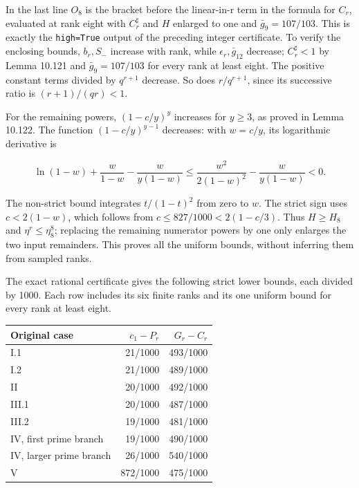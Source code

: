 \documentclass[
  11pt,
  a4paper,
]{article}
\newcounter{none} %
\begin{document}
In the last line \(O_8\) is the bracket before the linear-in-r term in
the formula for \(C_r\), evaluated at rank eight with \(C_r^\sharp\) and
\(H\) enlarged to one and \(\bar g_9=107/103\). This is exactly the
\texttt{high=True} output of the preceding integer certificate. To
verify the enclosing bounds, \(b_r,S_-\) increase with rank, while
\(\epsilon_r,\bar g_{12}\) decrease; \(C_r^\sharp<1\) by Lemma 10.121
and \(\bar g_9=107/103\) for every rank at least eight. The positive
constant terms divided by \(q^{r+1}\) decrease. So does \(r/q^{r+1}\),
since its successive ratio is \((r+1)/(qr)<1\).

For the remaining powers, \((1-c/y)^y\) increases for \(y\ge3\), as
proved in Lemma 10.122. The function \((1-c/y)^{y-1}\) decreases: with
\(w=c/y\), its logarithmic derivative is

\[
\ln(1-w)+\frac{w}{1-w}-\frac{w}{y(1-w)}
\le\frac{w^2}{2(1-w)^2}-\frac{w}{y(1-w)}<0.
\tag{10.411}
\]

The non-strict bound integrates \(t/(1-t)^2\) from zero to \(w\). The
strict sign uses \(c<2(1-w)\), which follows from
\(c\le827/1000<2(1-c/3)\). Thus \(H\ge H_8\) and \(\eta^r\le\eta_8^8\);
replacing the remaining numerator powers by one only enlarges the two
input remainders. This proves all the uniform bounds, without inferring
them from sampled ranks.

The exact rational certificate gives the following strict lower bounds,
each divided by 1000. Each row includes its six finite ranks and its one
uniform bound for every rank at least eight.

{\def\LTcaptype{none} %
\begin{longtable}[]{@{}lrr@{}}
\toprule\noalign{}
Original case & \(c_1-P_r\) & \(G_r-C_r\) \\
\midrule\noalign{}
\endhead
\bottomrule\noalign{}
\endlastfoot
I.1 & 21/1000 & 493/1000 \\
I.2 & 21/1000 & 489/1000 \\
II & 20/1000 & 492/1000 \\
III.1 & 20/1000 & 487/1000 \\
III.2 & 19/1000 & 481/1000 \\
IV, first prime branch & 19/1000 & 490/1000 \\
IV, larger prime branch & 26/1000 & 540/1000 \\
V & 872/1000 & 475/1000 \\
\end{longtable}
}
\end{document}
